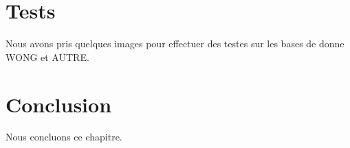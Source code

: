 \section{Tests}

Nous avons pris quelques images pour effectuer des testes sur les bases de donne WONG et AUTRE.

\section{Conclusion}

Nous concluons ce chapitre.
